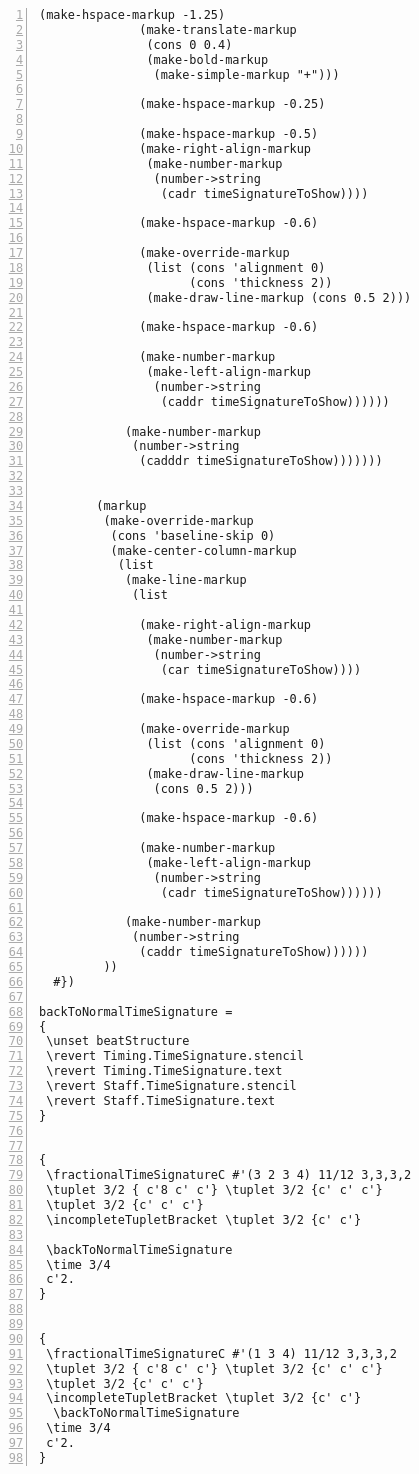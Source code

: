 \begin{Verbatim}[numbers=left,xleftmargin=5mm]
              (make-hspace-markup -1.25)
              (make-translate-markup
               (cons 0 0.4)
               (make-bold-markup
                (make-simple-markup "+")))

              (make-hspace-markup -0.25)

              (make-hspace-markup -0.5)
              (make-right-align-markup
               (make-number-markup
                (number->string
                 (cadr timeSignatureToShow))))

              (make-hspace-markup -0.6)

              (make-override-markup
               (list (cons 'alignment 0)
                     (cons 'thickness 2))
               (make-draw-line-markup (cons 0.5 2)))

              (make-hspace-markup -0.6)

              (make-number-markup
               (make-left-align-markup
                (number->string
                 (caddr timeSignatureToShow))))))

            (make-number-markup
             (number->string
              (cadddr timeSignatureToShow)))))))


        (markup
         (make-override-markup
          (cons 'baseline-skip 0)
          (make-center-column-markup
           (list
            (make-line-markup
             (list

              (make-right-align-markup
               (make-number-markup
                (number->string
                 (car timeSignatureToShow))))

              (make-hspace-markup -0.6)

              (make-override-markup
               (list (cons 'alignment 0)
                     (cons 'thickness 2))
               (make-draw-line-markup
                (cons 0.5 2)))

              (make-hspace-markup -0.6)

              (make-number-markup
               (make-left-align-markup
                (number->string
                 (cadr timeSignatureToShow))))))

            (make-number-markup
             (number->string
              (caddr timeSignatureToShow))))))
         ))
  #})

backToNormalTimeSignature =
{
 \unset beatStructure
 \revert Timing.TimeSignature.stencil
 \revert Timing.TimeSignature.text
 \revert Staff.TimeSignature.stencil
 \revert Staff.TimeSignature.text
}


{
 \fractionalTimeSignatureC #'(3 2 3 4) 11/12 3,3,3,2
 \tuplet 3/2 { c'8 c' c'} \tuplet 3/2 {c' c' c'}
 \tuplet 3/2 {c' c' c'}
 \incompleteTupletBracket \tuplet 3/2 {c' c'}

 \backToNormalTimeSignature
 \time 3/4
 c'2.
}


{
 \fractionalTimeSignatureC #'(1 3 4) 11/12 3,3,3,2
 \tuplet 3/2 { c'8 c' c'} \tuplet 3/2 {c' c' c'}
 \tuplet 3/2 {c' c' c'}
 \incompleteTupletBracket \tuplet 3/2 {c' c'}
  \backToNormalTimeSignature
 \time 3/4
 c'2.
}
\end{Verbatim}


